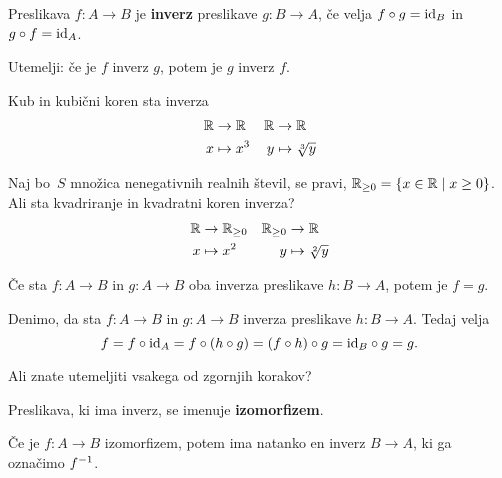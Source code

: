 \begin{definicija}
  Preslikava $f : A \to B$ je \textbf{inverz} preslikave $g : B \to A$, če velja $f \circ g = \id[B]$ in $g \circ f = \id[A]$.
\end{definicija}

\begin{naloga}
  Utemelji: če je $f$ inverz $g$, potem je $g$ inverz $f$.
\end{naloga}

\begin{primer}
  Kub in kubični koren sta inverza
  \begin{align*}
    \RR &\to \RR    &     \RR &\to \RR \\
    x &\mapsto x^3  &     y &\mapsto \sqrt[3]{y}
  \end{align*}
\end{primer}

\begin{naloga}
  Naj bo~$S$ množica nenegativnih realnih števil, se pravi, $\RR_{\geq 0} = \{x \in \RR \mid x \geq 0\}$. Ali sta kvadriranje in kvadratni koren inverza?
  \begin{align*}
    \RR &\to \RR_{\geq 0}    &     \RR_{\geq 0} &\to \RR \\
    x &\mapsto x^2           &     y &\mapsto \sqrt[2]{y}
  \end{align*}
\end{naloga}

\begin{izjava}
  Če sta $f : A \to B$ in $g : A \to B$ oba inverza preslikave $h : B \to A$, potem je $f = g$.
\end{izjava}

\begin{dokaz}
  Denimo, da sta $f : A \to B$ in $g : A \to B$ inverza preslikave $h : B \to A$. Tedaj velja
  \begin{equation*}
    f =
    f \circ \id[A] =
    f \circ (h \circ g) =
    (f \circ h) \circ g =
    \id[B] \circ g =
    g.
  \end{equation*}
\end{dokaz}

Ali znate utemeljiti vsakega od zgornjih korakov?

\begin{definicija}
  Preslikava, ki ima inverz, se imenuje \textbf{izomorfizem}.
\end{definicija}

Če je $f : A \to B$ izomorfizem, potem ima natanko en inverz $B \to A$, ki ga označimo $\inv{f}$.

